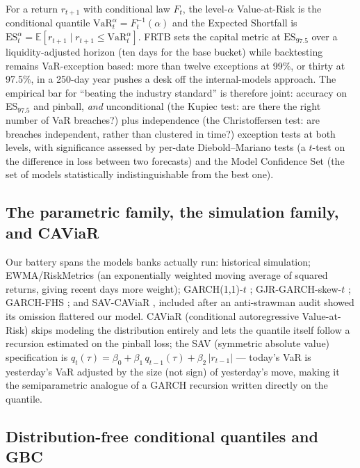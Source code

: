 \documentclass[11pt]{article}
\newcommand{\VaR}{\mathrm{VaR}}
\newcommand{\ES}{\mathrm{ES}}
\theoremstyle{remark}
\begin{document}
For a return $r_{t+1}$ with conditional law $F_t$, the level-$\alpha$
Value-at-Risk is the conditional quantile $\VaR_t^\alpha =
F_t^{-1}(\alpha)$ and the Expected Shortfall is $\ES_t^\alpha =
\mathbb{E}[r_{t+1} \mid r_{t+1} \le \VaR_t^\alpha]$. FRTB
\citep{bcbs2019frtb} sets the
capital metric at $\ES_{97.5}$ over a liquidity-adjusted horizon (ten
days for the base bucket) while backtesting remains VaR-exception based:
more than twelve exceptions at 99\%, or thirty at 97.5\%, in a 250-day
year pushes a desk off the internal-models approach. The empirical bar
for ``beating the industry standard'' is
therefore joint: accuracy on ES$_{97.5}$ and pinball, \emph{and}
unconditional \citep{kupiec1995} (the Kupiec test: are there the right
number of VaR breaches?) plus independence
\citep{christoffersen1998} (the Christoffersen test: are breaches
independent, rather than clustered in time?) exception tests at both levels, with
significance assessed by per-date Diebold--Mariano tests
\citep{dieboldmariano1995} (a $t$-test on the difference in loss between
two forecasts) and the Model Confidence Set
\citep{hansen2011mcs} (the set of models statistically indistinguishable
from the best one).

\subsection{The parametric family, the simulation family, and CAViaR}

Our battery spans the models banks actually run: historical simulation;
EWMA/RiskMetrics \citep{zumbach2007} (an exponentially weighted moving
average of squared returns, giving recent days more weight); GARCH(1,1)-$t$
\citep{bollerslev1986}; GJR-GARCH-skew-$t$ \citep[adding leverage and
skewness;][]{glosten1993};
GARCH-FHS \citep[parametric scale, empirical standardized residuals ---
the volatile-regime best practice;][]{baroneadesi1999fhs}; and SAV-CAViaR
\citep{engle2004caviar}, included
after an anti-strawman audit showed its omission flattered our model.
CAViaR (conditional autoregressive Value-at-Risk) skips modeling the
distribution entirely and lets the quantile itself follow a recursion
estimated on the pinball loss; the SAV (symmetric absolute value)
specification is
$q_t(\tau) = \beta_0 + \beta_1\, q_{t-1}(\tau) + \beta_2\,|r_{t-1}|$ ---
today's VaR is yesterday's VaR adjusted by the size (not sign) of
yesterday's move, making it the semiparametric analogue of a GARCH
recursion written directly on the quantile.

\subsection{Distribution-free conditional quantiles and GBC}
\end{document}
